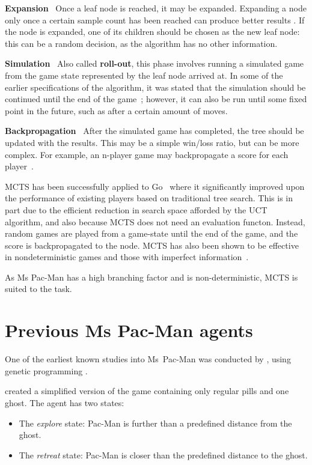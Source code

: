 \textbf{Expansion} ~Once a leaf node is reached, it may be expanded.  Expanding a node only once a certain sample count has been reached can produce better results .  If the node is expanded, one of its children should be chosen as the new leaf node: this can be a random decision, as the algorithm has no other information.

\textbf{Simulation} ~Also called \textbf{roll-out}, this phase involves running a simulated game from the game state represented by the leaf node arrived at.  In some of the earlier specifications of the algorithm, it was stated that the simulation should be continued until the end of the game~\citep{Chaslot2008}; however, it can also be run until some fixed point in the future, such as after a certain amount of moves.

\textbf{Backpropagation} ~After the simulated game has completed, the tree should be updated with the results.  This may be a simple win/loss ratio, but can be more complex.  For example, an n-player game may backpropagate a score for each player~\citep{Samothrakis2011}.

MCTS has been successfully applied to Go~\citep{Gelly2006} where it significantly improved upon the performance of existing players based on traditional tree search.  This is in part due to the efficient reduction in search space afforded by the UCT algorithm, and also because MCTS does not need an evaluation functon.  Instead, random games are played from a game-state until the end of the game, and the score is backpropagated to the node.  MCTS has also been shown to be effective in nondeterministic games and those with imperfect information~\citep{Kocsis2006}.

As Ms Pac-Man has a high branching factor and is non-deterministic, MCTS is suited to the task.

\section{Previous Ms Pac-Man agents}

One of the earliest known studies into Ms~Pac-Man was conducted by \citet{Koza1992}, using genetic programming .

\citet{Gallagher2003} created a simplified version of the game containing only regular pills and one ghost.  The agent has two states:

\begin{itemize}
\item The \emph{explore} state: Pac-Man is further than a predefined distance from the ghost.
\item The \emph{retreat} state: Pac-Man is closer than the predefined distance to the ghost.
\end{itemize}

